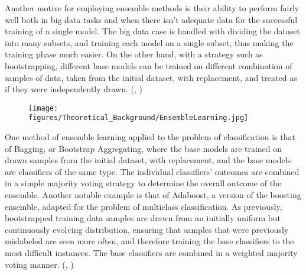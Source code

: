 {Another motive for employing ensemble methods is their ability to perform fairly well both in big data tasks and when there isn't adequate data for the successful training of a single model. The big data case is handled with dividing the dataset into many subsets, and training each model on a single subset, thus making the training phase much easier. On the other hand, with a strategy such as bootstrapping, different base models can be trained on different combination of samples of data, taken from the initial dataset, with replacement, and treated as if they were independently drawn. (\cite{65}, \cite{66})
\bigbreak
\begin{figure}[H]
    \centering
    \texttt{[image: figures/Theoretical\_Background/EnsembleLearning.jpg]}
    \caption{}
\end{figure}
\bigbreak
One method of ensemble learning applied to the problem of classification is that of Bagging, or Bootstrap Aggregating, where the base models are trained on drawn samples from the initial dataset, with replacement, and the base models are classifiers of the same type. The individual classifiers' outcomes are combined in a simple majority voting strategy to determine the overall outcome of the ensemble. Another notable example is that of Adaboost, a version of the boosting ensemble, adapted for the problem of multiclass classification. As previously, bootstrapped training data samples are drawn from an initially uniform but  continuously evolving distribution, ensuring that samples that were previously mislabeled are seen more often, and therefore training the base classifiers to the most difficult instances. The base classifiers are combined in a weighted majority voting manner.  (\cite{65}, \cite{67})
}